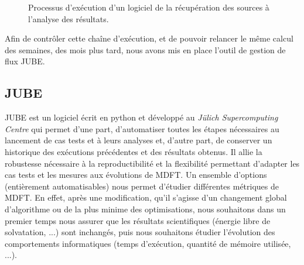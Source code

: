 \begin{figure}[ht]
  \center
  \caption{Processus d'exécution d'un logiciel de la récupération des sources à l'analyse des résultats.}
  \label{fig:JUBE_process}
\end{figure}

Afin de contrôler cette chaîne d’exécution, et de pouvoir relancer le même calcul des semaines, des mois plus tard, nous avons mis en place l’outil de gestion de flux JUBE\cite{Luhrs_parallel_2016,Galonska_advances_2012}.

\subsection{JUBE}
JUBE est un logiciel écrit en python et développé au \textit{Jülich Supercomputing Centre} qui permet d'une part, d'automatiser toutes les étapes nécessaires au lancement de cas tests et à leurs analyses et, d'autre part, de conserver un historique des exécutions précédentes et des résultats obtenus. Il allie la robustesse nécessaire à la reproductibilité et la flexibilité permettant d'adapter les cas tests et les mesures aux évolutions de MDFT. Un ensemble d'options (entièrement automatisables) nous permet d'étudier différentes métriques de MDFT. En effet, après une modification, qu'il s'agisse d'un changement global d'algorithme ou de la plus minime des optimisations, nous souhaitons dans un premier temps nous assurer que les résultats scientifiques (\'energie libre de solvatation, ...) sont inchangés, puis nous souhaitons étudier l'évolution des comportements informatiques (temps d'exécution, quantité de mémoire utilisée, ...).

